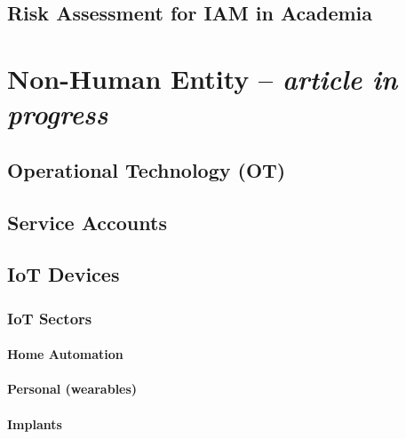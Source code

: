 \hypertarget{risk-assessment-for-iam-in-academia}{%
\section{Risk Assessment for IAM in
Academia}\label{risk-assessment-for-iam-in-academia}}

\hypertarget{non-human-entity-article-in-progress}{%
\chapter{\texorpdfstring{Non-Human Entity -- \emph{article in
progress}}{Non-Human Entity -- article in progress}}\label{non-human-entity-article-in-progress}}

\hypertarget{operational-technology-ot}{%
\section{Operational Technology
(OT)}\label{operational-technology-ot}}

\hypertarget{service-accounts}{%
\section{Service Accounts}\label{service-accounts}}

\hypertarget{iot-devices}{%
\section{IoT Devices}\label{iot-devices}}

\hypertarget{iot-sectors}{%
\subsection{IoT Sectors}\label{iot-sectors}}

\hypertarget{home-automation}{%
\subsubsection{Home Automation}\label{home-automation}}

\hypertarget{personal-wearables}{%
\subsubsection{Personal (wearables)}\label{personal-wearables}}

\hypertarget{implants}{%
\subsubsection{Implants}\label{implants}}


